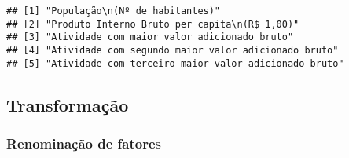 \documentclass[]{article}
\begin{document}
\begin{verbatim}
## [1] "População\n(Nº de habitantes)"                      
## [2] "Produto Interno Bruto per capita\n(R$ 1,00)"        
## [3] "Atividade com maior valor adicionado bruto"         
## [4] "Atividade com segundo maior valor adicionado bruto" 
## [5] "Atividade com terceiro maior valor adicionado bruto"
\end{verbatim}

\hypertarget{transformacao}{%
\subsection{Transformação}\label{transformacao}}

\hypertarget{renominacao-de-fatores}{%
\subsubsection{Renominação de fatores}\label{renominacao-de-fatores}}
\end{document}
